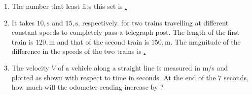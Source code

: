 \documentclass[journal]{IEEEtran}
\numberwithin{equation}{enumi}
\numberwithin{figure}{enumi}
\begin{document}
\begin{enumerate}
\hfill{}

\item The number that least fits this set  is \underline.

\begin{enumerate}
\end{enumerate}

\hfill{}

\item It takes $10,\text{s}$ and $15,\text{s}$, respectively, for two trains travelling at different constant speeds to completely pass a telegraph post. The length of the first train is $120,\text{m}$ and that of the second train is $150,\text{m}$. The magnitude of the difference in the speeds of the two trains  is \underline.

\begin{enumerate}
\end{enumerate}

\hfill{}

\item The velocity $V$ of a vehicle along a straight line is measured in m/s and plotted as shown with respect to time in seconds. At the end of the $7$ seconds, how much will the odometer reading increase by ?

\begin{enumerate}
\end{enumerate}

\hfill{}


\end{enumerate}
\end{document}
